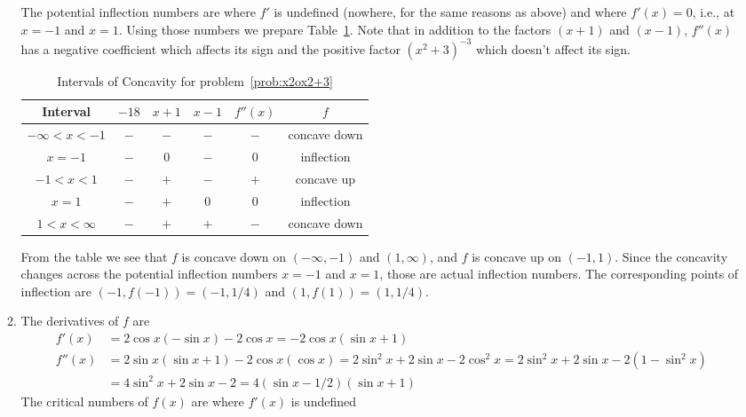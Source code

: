 \documentclass{article}
\begin{document}
\begin{enumerate}
\begin{enumerate}
    The potential inflection numbers are where $f'$ is undefined
    (nowhere, for the same reasons as above) and where $f'(x)=0$,
    i.e., at $x=-1$ and $x=1$.  Using those numbers we prepare
    Table~\ref{tab:x2ox2+3fpp}.  Note that in addition to the factors
    $(x+1)$ and $(x-1)$, $f''(x)$ has a negative coefficient which
    affects its sign and the positive factor $(x^2+3)^{-3}$ which
    doesn't affect its sign.
    \begin{table}[htbp]
      \centering
      \begin{tabular}{|c|c|c|c|c|c|}
        \hline
        Interval       & $-18$ & $x+1$ & $x-1$ & $f''(x)$ & $f$
        \\
        \hline\hline
        $-\infty<x<-1$ & $-$   & $-$   & $-$   & $-$     & concave down
        \\
        \hline
        $x=-1$         & $-$   & $0$   & $-$   & $0$     & inflection
        \\
        \hline
        $-1<x<1$       & $-$   & $+$   & $-$   & $+$     & concave up
        \\
        \hline
        $x=1$          & $-$   & $+$   & $0$   & $0$     & inflection
        \\
        \hline
        $1<x<\infty$   & $-$   & $+$   & $+$   & $-$     & concave down
        \\
        \hline
      \end{tabular}
      \caption{Intervals of Concavity for problem~\ref{prob:x2ox2+3}}
      \label{tab:x2ox2+3fpp}
    \end{table}
    From the table we see that $f$ is concave down on $(-\infty,-1)$
    and $(1,\infty)$, and $f$ is concave up on $(-1,1)$.  Since the
    concavity changes across the potential inflection numbers $x=-1$
    and $x=1$, those are actual inflection numbers.  The corresponding
    points of inflection are $(-1,f(-1))=(-1,1/4)$ and
    $(1,f(1))=(1,1/4)$.
  \item\label{prob:c2-2s} %
    The derivatives of $f$ are
    \begin{align*}
      f'(x) &= 2\cos x (-\sin x) -2\cos x = -2\cos x (\sin x + 1) \\
      f''(x) &= 2\sin x (\sin x + 1) - 2\cos x (\cos x)
      = 2\sin^2 x + 2\sin x - 2\cos^2 x = 2\sin^2 x + 2\sin x - 2(1-\sin^2 x)
      \\
      &= 4\sin^2 x + 2\sin x - 2 = 4(\sin x-1/2)(\sin x + 1)
    \end{align*}
    The critical numbers of $f(x)$ are where $f'(x)$ is undefined

\end{enumerate}
\end{enumerate}
\end{document}
